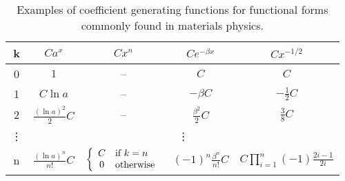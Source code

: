 \begin{table}[htp]
\caption{Examples of coefficient generating functions for functional forms commonly found in materials physics.}
\begin{center}
\begin{tabular}{c | c c c c}
	k	& %
		$C a^x$	& %
			$C x^n$	& %
				$Ce^{-\beta x}$	& %
					$C x^{-1/2}$ \\[2ex]
	\hline
	0	& %
		$1$	& %
			--	& %
				$C$	& %
					$C$ \\[2ex]
	1	& %
		$C \ln a$	& %
			--	& %
				$-\beta C$		& %
					$-\frac{1}{2}C$ \\[2ex]
	2	& %
		$\frac{(\ln a)^2}{2} C$	& %
			--	&  %
				$\frac{\beta^2}{2} C$	& %
					$\frac{3}{8}C$	\\[2ex]
	\vdots & \multicolumn{4}{c}{\vdots} \\[2ex]
	n	& %
		$\frac{(\ln a)^n}{n!} C$	& %
			$\left\{\begin{array}{c l}
				C & \text{if}\ k = n \\
				0 & \text{otherwise}
			  \end{array}\right.$	& %
				$(-1)^n\frac{\beta^n}{n!} C$	& %
					$C \prod_{i=1}^n (-1)\frac{2i - 1}{2i}$ \\[2ex]
	\hline
\end{tabular}
\end{center}
\label{tab:generating functions of common functions}
\end{table}%


